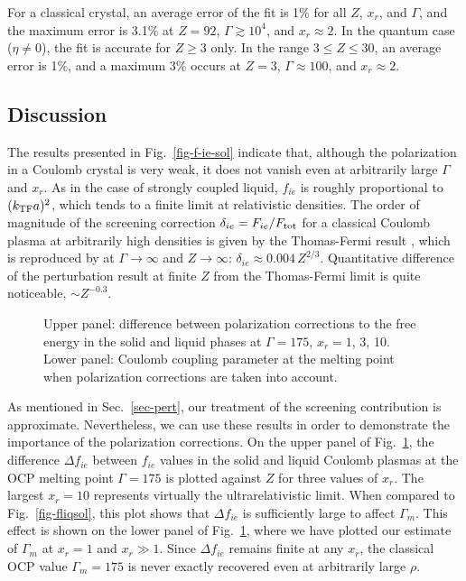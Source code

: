 For a classical crystal, an average error of the fit is 1\%
for all $Z$, $x_r$, and $\Gamma$,
and the maximum error is 3.1\% at $Z=92$, $\Gamma\gtrsim10^4$,
and $x_r\approx2$.
In the quantum case ($\eta\neq0$), the fit is accurate
for $Z\geq3$ only. In the range $3\leq Z\leq 30$,
an average error is 1\%, and a maximum 3\% 
occurs at $Z=3$,
$\Gamma\approx100$, and $x_r\approx2$.

\subsection{Discussion}
%
The results presented in Fig.~\ref{fig-f-ie-sol} indicate that,
although the polarization 
in a Coulomb crystal is very weak, it does not vanish
even at arbitrarily large $\Gamma$ and $x_r$.
As in the case of strongly coupled liquid, 
$f_{ie}$ is roughly proportional to $(k_{\rm TF}a)^2$, which tends
to a finite limit at relativistic densities.
The order of magnitude of 
the screening correction $\delta_{ie}=F_{ie}/F_{\rm tot}$
for a classical Coulomb plasma
at arbitrarily high densities
is given by the Thomas-Fermi result \cite{Salpeter},
which is reproduced by  at 
$\Gamma\to\infty$ and $Z\to\infty$:
$\delta_{ie}\approx0.004\,Z^{2/3}$.
Quantitative difference of the perturbation result
at finite $Z$
from the Thomas-Fermi limit is quite noticeable, $\sim Z^{-0.3}$.


\begin{figure}
    \begin{center}
    \leavevmode
    \epsfxsize=86mm
    \end{center}
\caption{
Upper panel: difference between polarization corrections
to the free energy in the solid and liquid phases 
at $\Gamma=175$, $x_r=1$, 3, 10.
Lower panel: Coulomb coupling parameter at the melting point
when polarization corrections are taken into account.
}
\label{fig-fliqsolz}
\end{figure}


As mentioned in Sec.~\ref{sec-pert}, 
our treatment of the screening
contribution is approximate.
Nevertheless, we can use these results in order to demonstrate
the importance of the polarization corrections.
On the upper panel of Fig.~\ref{fig-fliqsolz},
the difference $\Delta f_{ie}$ between $f_{ie}$ values in the 
solid and liquid Coulomb plasmas
at the OCP melting point $\Gamma=175$
is plotted against $Z$ for three values of $x_r$.
The largest $x_r=10$ represents virtually
the ultrarelativistic limit.
When compared to Fig.~\ref{fig-fliqsol},
this plot shows that $\Delta f_{ie}$
is sufficiently large to affect $\Gamma_m$.
This effect is shown on the lower panel of Fig.~\ref{fig-fliqsolz},
where we have plotted our estimate of $\Gamma_m$ at $x_r=1$ and $x_r\gg1$.
Since $\Delta f_{ie}$ remains finite at any $x_r$,
the classical OCP value $\Gamma_m=175$ is never
exactly recovered even at arbitrarily large $\rho$.

